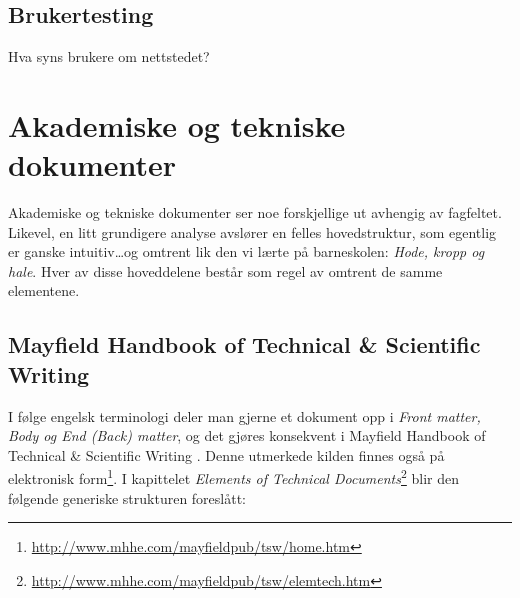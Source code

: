 \subsection{Brukertesting}
Hva syns brukere om nettstedet?






\section{Akademiske og tekniske dokumenter}

Akademiske og tekniske dokumenter ser noe forskjellige ut avhengig av fagfeltet. Likevel, en litt grundigere analyse avslører en felles hovedstruktur, som egentlig er ganske intuitiv\dots og omtrent lik den vi lærte på barneskolen: {\em Hode, kropp og hale}. Hver av disse hoveddelene består som regel av omtrent de samme elementene. 



\subsection{Mayfield Handbook of Technical \& Scientific Writing}
\label{sec:mayfield}

I følge engelsk terminologi deler man gjerne et dokument opp i {\em Front matter, Body og End (Back) matter}, og det gjøres konsekvent i
Mayfield Handbook of Technical \& Scientific Writing \cite{perelman97mht}. Denne utmerkede kilden finnes også på 
elektronisk form\footnote{\url{http://www.mhhe.com/mayfieldpub/tsw/home.htm}}. 
I kapittelet 
{\em Elements of Technical Documents}\footnote{\url{http://www.mhhe.com/mayfieldpub/tsw/elemtech.htm}}
blir den følgende generiske strukturen foreslått:

